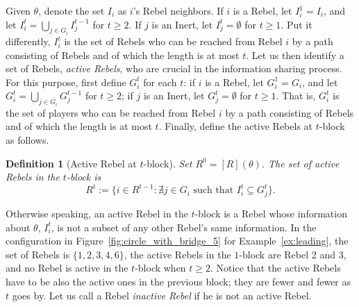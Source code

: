 \documentclass[12pt,letter]{article}
\newtheorem{definition}{Definition}[section]
\theoremstyle{definition}
\theoremstyle{remark}
\theoremstyle{claim}
\begin{document}
Given $\theta$, denote the set $I_i$ as $i$'s Rebel neighbors. If $i$ is a Rebel, let $I^1_i= I_i$, and let $I^t_i= \bigcup_{j\in G_i} I^{t-1}_j$ for $t\geq 2$. If $j$ is an Inert, let $I^t_j=\emptyset$ for $t\geq 1$. Put it differently, $I^t_i$ is the set of Rebels who can be reached from Rebel $i$ by a path consisting of Rebels and of which the length is at most $t$. Let us then identify a set of Rebels, \textit{active Rebels}, who are crucial in the information sharing process. For this purpose, first define $G^t_i$ for each $t$: if $i$ is a Rebel, let $G^1_i= G_i$, and let $G^t_i= \bigcup_{j\in G_i} G^{t-1}_j$ for $t\geq 2$; if $j$ is an Inert, let $G^t_j=\emptyset$ for $t\geq 1$. That is, $G^t_i$ is the set of players who can be reached from Rebel $i$ by a path consisting of Rebels and of which the length is at most $t$. Finally, define the active Rebels at $t$-block as follows.
\begin{definition}[Active Rebel at $t$-block]
Set $R^0=[R](\theta)$. The set of active Rebels in the $t$-block is 
\[\text{$R^t:= \{i\in R^{t-1}: \nexists j\in G_i \text{ such that }I^t_i\subseteq G^t_j\}$}.\]
\end{definition}
Otherwise speaking, an active Rebel in the $t$-block is a Rebel whose information about $\theta$, $I^t_i$, is not a subset of any other Rebel's same information. In the configuration in Figure~\ref{fig:circle_with_bridge_5} for Example~\ref{ex:leading}, the set of Rebels is $\{1,2,3,4,6\}$, the active Rebels in the $1$-block are Rebel 2 and 3, and no Rebel is active in the $t$-block when $t\geq 2$. %
Notice that the active Rebels have to be also the active ones in the previous block; they are fewer and fewer as $t$ goes by. Let us call a Rebel \textit{inactive Rebel} if he is not an active Rebel.

%
%    
%    
%    
%        
\end{document}
